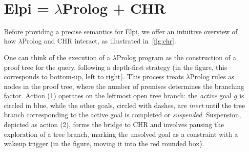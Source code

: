 \documentclass[a4paper, 11pt]{book}
\begin{document}








\newpage
~
\newpage
\section{Elpi = $\lambda$Prolog + CHR}\label{sec:elpiLP+CHR}


Before providing a precise semantics for Elpi, we offer an intuitive overview of
how $\lambda$Prolog and CHR interact, as illustrated in~\cref{fig:chr}.

One can think of the execution of a $\lambda$Prolog program as the construction
of a proof tree for the query, following a depth-first strategy (in the figure,
this corresponds to bottom-up, left to right). This process treats
$\lambda$Prolog rules as nodes in the proof tree, where the number of premises
determines the branching factor. Action (1) operates on the leftmost open tree
branch: the \emph{active} goal $g$ is circled in blue, while the other goals,
circled with dashes, are \emph{inert} until the tree branch corresponding to the
active goal is completed or \emph{suspended}. Suspension, depicted as action (2),
forms the bridge to CHR and involves pausing the exploration of a tree branch,
marking the unsolved goal as a constraint with a wakeup trigger (in the figure,
moving it into the red rounded box).
\end{document}
